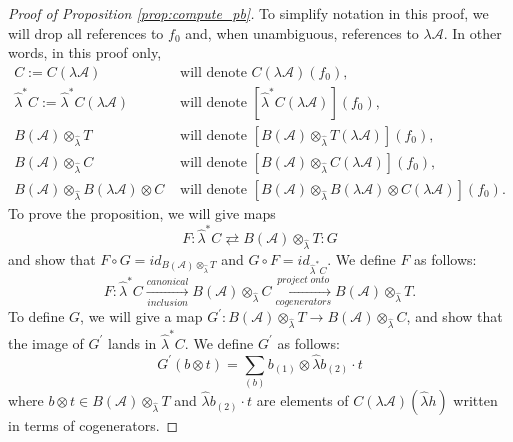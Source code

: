 \begin{proof}[Proof of Proposition \ref{prop:compute_pb}]
To simplify notation in this proof, 
we will drop all references to $f_0$ and,
when unambiguous, references to $\lambda \mathcal{A}$. 
In other words, in this proof only,
\begin{align*}
C := C(\lambda \mathcal{A}) 
&\textrm{ will denote } C(\lambda \mathcal{A})(f_0), \\
\hat{\lambda}^*C := \hat{\lambda}^*C(\lambda \mathcal{A}) 
&\textrm{ will denote } [\hat{\lambda}^*C(\lambda \mathcal{A})](f_0), \\
B(\mathcal{A}) \otimes_{\hat{\lambda}} T 
&\textrm{ will denote } [B(\mathcal{A}) \otimes_{\hat{\lambda}} T(\lambda \mathcal{A})](f_0), \\
B(\mathcal{A}) \otimes_{\hat{\lambda}} C 
&\textrm{ will denote } [B(\mathcal{A}) \otimes_{\hat{\lambda}} C(\lambda \mathcal{A})](f_0), \\
B(\mathcal{A}) \otimes_{\hat{\lambda}} B(\lambda \mathcal{A}) \otimes C 
&\textrm{ will denote } 
[B(\mathcal{A}) \otimes_{\hat{\lambda}} B(\lambda \mathcal{A}) \otimes C(\lambda \mathcal{A})](f_0).
\end{align*}
%
To prove the proposition, 
we will give maps
$$
F: \hat{\lambda}^*C \rightleftarrows B(\mathcal{A}) \otimes_{\hat{\lambda}} T:G
$$
and show that $F\circ G = id_{B(\mathcal{A}) \otimes_{\hat{\lambda}} T}$ 
and $G \circ F = id_{\hat{\lambda}^*C}$.
We define $F$ as follows: 
$$
F:\hat{\lambda}^*C 
\xrightarrow[inclusion]{canonical}
B(\mathcal{A}) \otimes_{\hat{\lambda}} C
\xrightarrow[cogenerators]{project\;onto}
B(\mathcal{A}) \otimes_{\hat{\lambda}} T.
$$
To define $G$, we will give a map 
$G^\prime: B(\mathcal{A}) \otimes_{\hat{\lambda}} T \to 
B(\mathcal{A}) \otimes_{\hat{\lambda}} C$, and show that the image of 
$G^\prime$ lands in $\hat{\lambda}^*C$. We define 
$G^\prime$ as follows:
$$
G^\prime(b \otimes t) = 
\sum \limits_{(b)} b_{(1)} \otimes \hat{\lambda} b_{(2)} \cdot t
$$
where $b \otimes t \in B(\mathcal{A}) \otimes_{\hat{\lambda}} T$ and $\hat{\lambda} 
b_{(2)} \cdot t$ are elements of $C(\lambda \mathcal{A})(\hat{\lambda} h)$ 
written in terms of cogenerators.


\end{proof}
